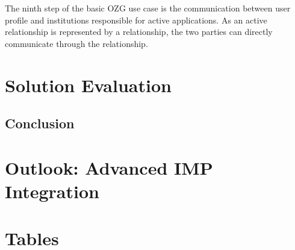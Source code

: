 \documentclass[
     12pt,         %
     a4paper,      %
     BCOR=10mm,version=first,     %
     DIV=14,version=first,        %
     ]{scrreprt}
\begin{document}
The ninth step of the basic OZG use case is the communication between user profile and institutions responsible for active applications. As an active relationship is represented by a relationship, the two parties can directly communicate through the relationship.

\chapter{Solution Evaluation}

\section{Conclusion}

\chapter{Outlook: Advanced IMP Integration}

\chapter{Tables}
\end{document}
